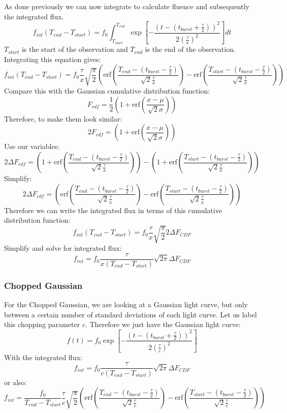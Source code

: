 \documentclass{article}
\begin{document}
As done previously we can now integrate to calculate fluence and subsequently the integrated flux. 
\[f_{int}(T_{end}-T_{start}) = f_0 \int_{T_{start}}^{T_{end}} \exp[-\frac{(t-(t_{burst}+\frac{\tau}{2}))^2}{2(\frac{\tau}{x})^2}]dt\]
$T_{start}$ is the start of the observation and $T_{end}$ is the end of the observation. Integrating this equation gives:
\[f_{int}(T_{end}-T_{start}) = f_0 \frac{\tau}{x}\sqrt{\frac{\pi}{2}}(\text{erf}(\frac{T_{end}-(t_{burst}-\frac{\tau}{2})}{\sqrt{2}\frac{\tau}{x}})-\text{erf}(\frac{T_{start}-(t_{burst}-\frac{\tau}{2})}{\sqrt{2}\frac{\tau}{x}}))\]
Compare this with the Gaussian cumulative distribution function:
\[F_{cdf}=\frac{1}{2}(1+\text{erf}(\frac{x-\mu}{\sqrt{2}\sigma}))\]
Therefore, to make them look similar:
\[2F_{cdf}=(1+\text{erf}(\frac{x-\mu}{\sqrt{2}\sigma}))\]
Use our variables:
\[2\Delta F_{cdf}=(1+\text{erf}(\frac{T_{end}-(t_{burst}-\frac{\tau}{2})}{\sqrt{2}\frac{\tau}{x}}))-(1+\text{erf}(\frac{T_{start}-(t_{burst}-\frac{\tau}{2})}{\sqrt{2}\frac{\tau}{x}}))\]
Simplify:
\[2\Delta F_{cdf}=(\text{erf}(\frac{T_{end}-(t_{burst}-\frac{\tau}{2})}{\sqrt{2}\frac{\tau}{x}}) - \text{erf}(\frac{T_{start}-(t_{burst}-\frac{\tau}{2})}{\sqrt{2}\frac{\tau}{x}}))\]
Therefore we can write the integrated flux in terms of this cumulative distribution function:
\[f_{int}(T_{end}-T_{start}) = f_0 \frac{\tau}{x}\sqrt{\frac{\pi}{2}}2\Delta F_{CDF}\]
Simplify and solve for integrated flux:
\[f_{int} = f_0 \frac{\tau}{x(T_{end}-T_{start})}\sqrt{2\pi}\Delta F_{CDF}\]
\subsubsection{Chopped Gaussian}
For the Chopped Gaussian, we are looking at a Gaussian light curve, but only between a certain number of standard deviations of each light curve. Let us label this chopping parameter $c$.
Therefore we just have the Gaussian light curve:
\[f(t) = f_0  \exp[-\frac{(t-(t_{burst}+\frac{\tau}{2}))^2}{2(\frac{\tau}{c})^2}]\]
With the integrated flux:
\[f_{int} = f_0 \frac{\tau}{c(T_{end}-T_{start})}\sqrt{2\pi}\Delta F_{CDF}\]
or also:
\[f_{int} = \frac{f_0}{T_{end}-T_{start}} \frac{\tau}{c}\sqrt{\frac{\pi}{2}}(\text{erf}(\frac{T_{end}-(t_{burst}-\frac{\tau}{2})}{\sqrt{2}\frac{\tau}{c}})-\text{erf}(\frac{T_{start}-(t_{burst}-\frac{\tau}{2})}{\sqrt{2}\frac{\tau}{c}}))\]
\end{document}
